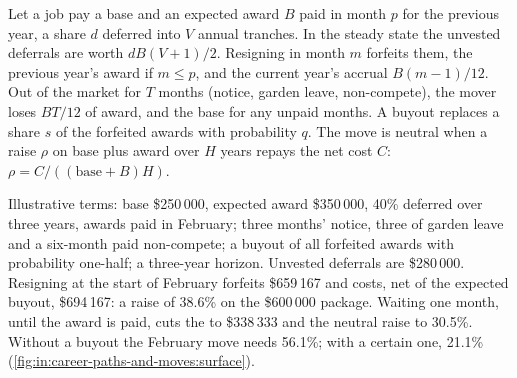 \begin{method}\label{met:in:career-paths-and-moves:move}
Let a job pay a base and an expected award $B$ paid in month $p$ for the previous year, a share $d$ deferred into $V$
annual tranches. In the steady state the unvested deferrals are worth $dB(V+1)/2$. Resigning in month $m$ forfeits them,
the previous year's award if $m\le p$, and the current year's accrual $B(m-1)/12$. Out of the market for $T$ months
(notice, garden leave, non-compete), the mover loses $BT/12$ of award, and the base for any unpaid months. A buyout
replaces a share $s$ of the forfeited awards with probability $q$. The move is neutral when a raise $\rho$ on base plus
award over $H$ years repays the net cost $C$: $\rho=C/((\text{base}+B)H)$.
\end{method}

\begin{example}\label{ex:in:career-paths-and-moves:move}
Illustrative terms: base \$250\,000, expected award \$350\,000, 40\% deferred over three years, awards paid in February;
three months' notice, three of garden leave and a six-month paid non-compete; a buyout of all forfeited awards with
probability one-half; a three-year horizon. Unvested deferrals are \$280\,000. Resigning at the start of February
forfeits \$659\,167 and costs, net of the expected buyout, \$694\,167: a raise of 38.6\% on the \$600\,000 package. Waiting
one month, until the award is paid, cuts the  to \$338\,333 and the neutral raise to 30.5\%. Without a buyout
the February move needs 56.1\%; with a certain one, 21.1\% (\cref{fig:in:career-paths-and-moves:surface}).
\end{example}

